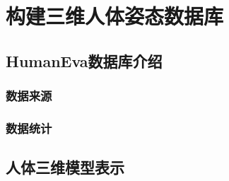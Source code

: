 


\chapter{构建三维人体姿态数据库}
\section{HumanEva数据库介绍}
\subsection{数据来源}

\subsection{数据统计}

\section{人体三维模型表示}



